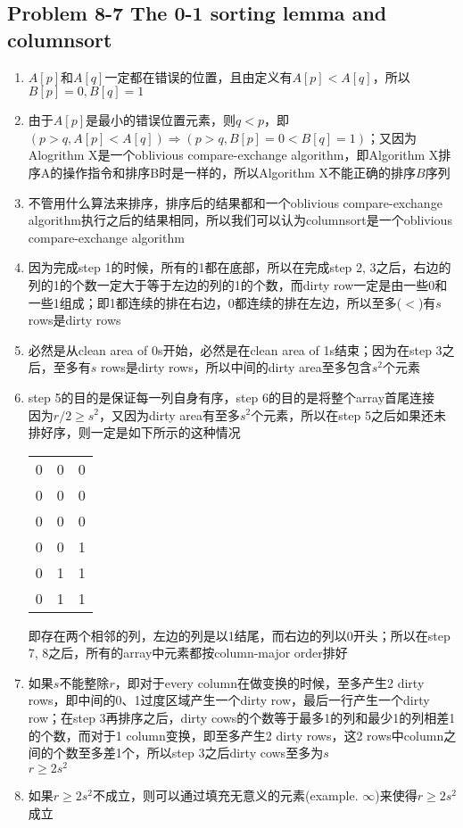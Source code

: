 \subsection*{Problem 8-7 The 0-1 sorting lemma and columnsort}
\begin{enumerate}
	\item	$A[p]$和$A[q]$一定都在错误的位置，且由定义有$A[p] < A[q]$，所以$B[p] = 0, B[q] = 1$
	\item	由于$A[p]$是最小的错误位置元素，则$q < p$，即$(p > q, A[p] < A[q]) \Rightarrow (p > q, B[p] = 0 < B[q] = 1)$；又因为Alogrithm X是一个oblivious compare-exchange algorithm，即Algorithm X排序A的操作指令和排序B时是一样的，所以Algorithm X不能正确的排序$B$序列
	\item	不管用什么算法来排序，排序后的结果都和一个oblivious compare-exchange algorithm执行之后的结果相同，所以我们可以认为columnsort是一个oblivious compare-exchange algorithm
	\item	因为完成step 1的时候，所有的1都在底部，所以在完成step 2, 3之后，右边的列的1的个数一定大于等于左边的列的1的个数，而dirty row一定是由一些0和一些1组成；即1都连续的排在右边，0都连续的排在左边，所以至多($<$)有$s$ rows是dirty rows
	\item	必然是从clean area of 0s开始，必然是在clean area of 1s结束；因为在step 3之后，至多有$s$ rows是dirty rows，所以中间的dirty area至多包含$s^2$个元素
	\item	step 5的目的是保证每一列自身有序，step 6的目的是将整个array首尾连接 \\
		因为$r / 2 \geq s^2$，又因为dirty area有至多$s^2$个元素，所以在step 5之后如果还未排好序，则一定是如下所示的这种情况
		\begin{center}
			\begin{tabular}{lll}
				0 & 0 & 0 \\
				0 & 0 & 0 \\
				0 & 0 & 0 \\
				0 & 0 & 1 \\
				0 & 1 & 1 \\
				0 & 1 & 1 \\
			\end{tabular}
		\end{center}
		即存在两个相邻的列，左边的列是以1结尾，而右边的列以0开头；所以在step 7, 8之后，所有的array中元素都按column-major order排好
	\item	如果$s$不能整除$r$，即对于every column在做变换的时候，至多产生2 dirty rows，即中间的0、1过度区域产生一个dirty row，最后一行产生一个dirty row；在step 3再排序之后，dirty cows的个数等于最多1的列和最少1的列相差1的个数，而对于1 column变换，即至多产生2 dirty rows，这2 rows中column之间的个数至多差1个，所以step 3之后dirty cows至多为$s$ \\
		$r \geq 2s^2$
	\item	如果$r \geq 2s^2$不成立，则可以通过填充无意义的元素(example. $\infty$)来使得$r \geq 2s^2$成立
\end{enumerate}

